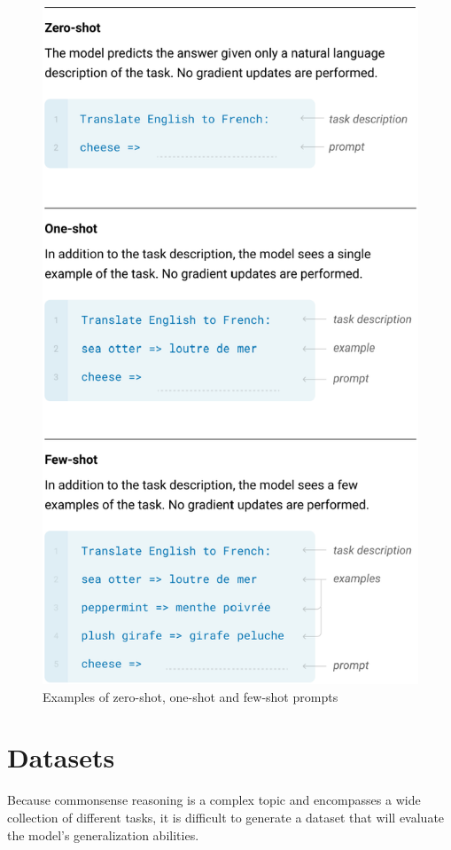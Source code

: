 \documentclass[fleqn,moreauthors,10pt]{ds_report}
\begin{document}
\begin{figure}[!h]\centering
	\includegraphics[width=\linewidth]{fig/few-shot-new.png}
	\caption{Examples of zero-shot, one-shot and few-shot prompts}
	\label{fig:column}
\end{figure}


\section*{Datasets}
Because commonsense reasoning is a complex topic and encompasses a wide collection of different tasks, it is difficult to generate a dataset that will evaluate the model's generalization abilities.
\end{document}
